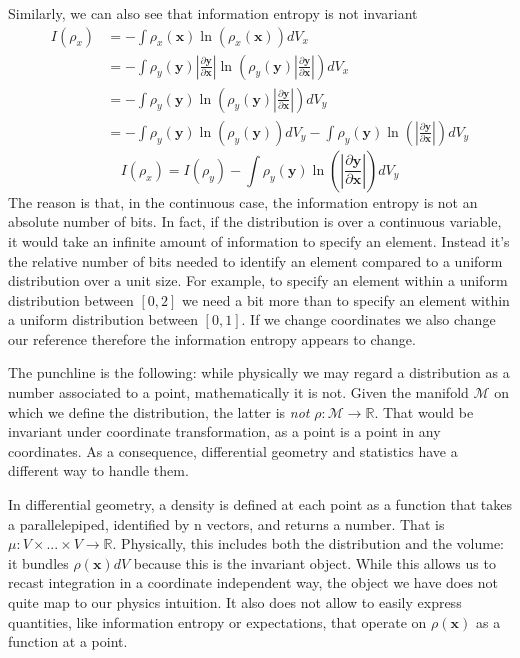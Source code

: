 \documentclass[smallextended]{svjour3}
\numberwithin{equation}{section}
\theoremstyle{definition}
\begin{document}
Similarly, we can also see that information entropy is not invariant
\begin{align*}
I(\rho_x) &=-\int \rho_x(\mathbf{x}) \ln (\rho_x(\mathbf{x})) dV_x \\
&=-\int \rho_y(\mathbf{y}) \left|\frac{\partial \mathbf{y}}{\partial \mathbf{x}}\right| \ln (\rho_y(\mathbf{y}) \left|\frac{\partial \mathbf{y}}{\partial \mathbf{x}}\right|) dV_x \\
&=-\int \rho_y(\mathbf{y}) \ln (\rho_y(\mathbf{y}) \left|\frac{\partial \mathbf{y}}{\partial \mathbf{x}}\right|) dV_y \\
&=-\int \rho_y(\mathbf{y}) \ln (\rho_y(\mathbf{y})) dV_y - \int \rho_y(\mathbf{y}) \ln (\left|\frac{\partial \mathbf{y}}{\partial \mathbf{x}}\right|) dV_y
\end{align*}
\begin{equation}\label{entropy_transformation}
I(\rho_x) =I(\rho_y) - \int \rho_y(\mathbf{y}) \ln (\left|\frac{\partial \mathbf{y}}{\partial \mathbf{x}}\right|) dV_y
\end{equation}
The reason is that, in the continuous case, the information entropy is not an absolute number of bits. In fact, if the distribution is over a continuous variable, it would take an infinite amount of information to specify an element. Instead it's the relative number of bits needed to identify an element compared to a uniform distribution over a unit size. For example, to specify an element within a uniform distribution between $[0,2]$ we need a bit more than to specify an element within a uniform distribution between $[0,1]$. If we change coordinates we also change our reference therefore the information entropy appears to change.

The punchline is the following: while physically we may regard a distribution as a number associated to a point, mathematically it is not. Given the manifold $\mathcal{M}$ on which we define the distribution, the latter is \emph{not} $\rho : \mathcal{M} \rightarrow \mathbb{R}$. That would be invariant under coordinate transformation, as a point is a point in any coordinates. As a consequence, differential geometry and statistics have a different way to handle them. 

In differential geometry, a density is defined at each point as a function that takes a parallelepiped, identified by n vectors, and returns a number. That is $\mu : V \times ... \times V \rightarrow \mathbb{R}$. Physically, this includes both the distribution and the volume: it bundles $\rho(\mathbf{x}) dV$ because this is the invariant object. While this allows us to recast integration in a coordinate independent way, the object we have does not quite map to our physics intuition. It also does not allow to easily express quantities, like information entropy or expectations, that operate on $\rho(\mathbf{x})$ as a function at a point.
\end{document}
